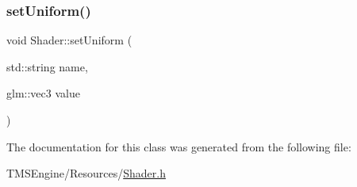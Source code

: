 \mbox{\label{class_shader_ad97eff9ea48cee42227e31c56cd7479e}} 
\subsubsection{\texorpdfstring{set\+Uniform()}{setUniform()}\hspace{0.1cm}{\footnotesize\ttfamily [4/4]}}
{\footnotesize\ttfamily void Shader\+::set\+Uniform (\begin{DoxyParamCaption}\item[{std\+::string}]{name,  }\item[{glm\+::vec3}]{value }\end{DoxyParamCaption})}



The documentation for this class was generated from the following file\+:\begin{DoxyCompactItemize}
\item 
T\+M\+S\+Engine/\+Resources/\hyperlink{_shader_8h}{Shader.\+h}\end{DoxyCompactItemize}
